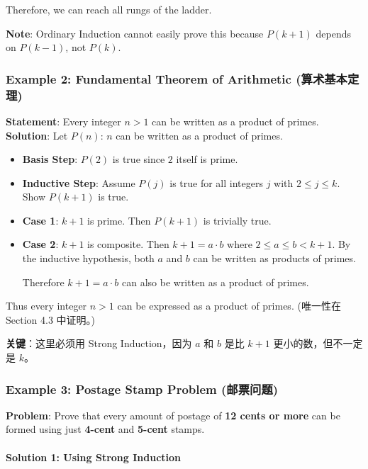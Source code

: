 \documentclass[10pt,a4paper,openany]{ctexbook}
\theoremstyle{definition}
\theoremstyle{remark}
\renewenvironment{quote}
  {\list{}{\leftmargin=1em\rightmargin=0pt\topsep=0.5pt\partopsep=0pt}\item[]}
  {\endlist}
\begin{document}
Therefore, we can reach all rungs of the ladder.
\begin{quote}
\textbf{Note}: Ordinary Induction cannot easily prove this because $P(k+1)$ depends on $P(k-1)$, not $P(k)$.

\end{quote}
\vspace{-2pt}

\subsubsection{Example 2: Fundamental Theorem of Arithmetic (算术基本定理)}

\textbf{Statement}: Every integer $n > 1$ can be written as a product of primes.
\textbf{Solution}:
Let $P(n)$: $n$ can be written as a product of primes.
\begin{itemize}
\item \textbf{Basis Step}: $P(2)$ is true since $2$ itself is prime.
\item \textbf{Inductive Step}: Assume $P(j)$ is true for all integers $j$ with $2 \le j \le k$. Show $P(k+1)$ is true.
\item \textbf{Case 1}: $k+1$ is prime. Then $P(k+1)$ is trivially true.
\item \textbf{Case 2}: $k+1$ is composite. Then $k+1 = a \cdot b$ where $2 \le a \le b < k+1$.
By the inductive hypothesis, both $a$ and $b$ can be written as products of primes.

Therefore $k+1 = a \cdot b$ can also be written as a product of primes.


\end{itemize}

Thus every integer $n > 1$ can be expressed as a product of primes.
(唯一性在 Section 4.3 中证明。)
\begin{quote}
\textbf{关键}：这里必须用 Strong Induction，因为 $a$ 和 $b$ 是比 $k+1$ 更小的数，但不一定是 $k$。

\end{quote}
\vspace{-2pt}

\subsubsection{Example 3: Postage Stamp Problem (邮票问题)}

\textbf{Problem}: Prove that every amount of postage of \textbf{12 cents or more} can be formed using just \textbf{4-cent} and \textbf{5-cent} stamps.
\paragraph{Solution 1: Using Strong Induction}
\end{document}
